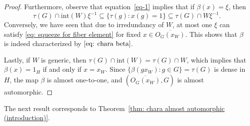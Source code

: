 \documentclass[titlepage,reqno,10pt]{amsart}
\theoremstyle{definition}
\newcommand{\ol}[1]{\overline{#1}}
\begin{document}
\begin{proof}

Furthermore, observe that equation~\eqref{eq-1} implies that if $\beta(x)=\xi$, then
\begin{equation}\label{eq: squeeze for fiber element}
 \tau(G)\cap \mathrm{int}(W)\xi^{-1}\subseteq \{\tau(g): x(g)=1\}\subseteq \tau(G)\cap W\xi^{-1}.
\end{equation}
Conversely, we have seen that due to irredundancy of $W$, at most one $\xi$ can satisfy \eqref{eq: squeeze for fiber element} for fixed $x\in \ol{O_G(x_W)}$.
This shows that $\beta$ is indeed characterized by $\eqref{eq: chara beta}$.

Lastly, if $W$ is generic, then $\tau(G)\cap \mathrm{int}(W)=\tau(G)\cap W$, which implies that $\beta(x)=1_{H}$ if and only if $x=x_W$. Since $\{\beta(gx_W): g\in G\}=\tau(G)$ is dense in $H$, the map $\beta$ is almost one-to-one, and $(\overline{O_G(x_W)},G)$ is almost automorphic. 
\end{proof}

The next result corresponds to Theorem~\ref{thm: chara almost automorphic (introduction)}.
 
\end{document}
